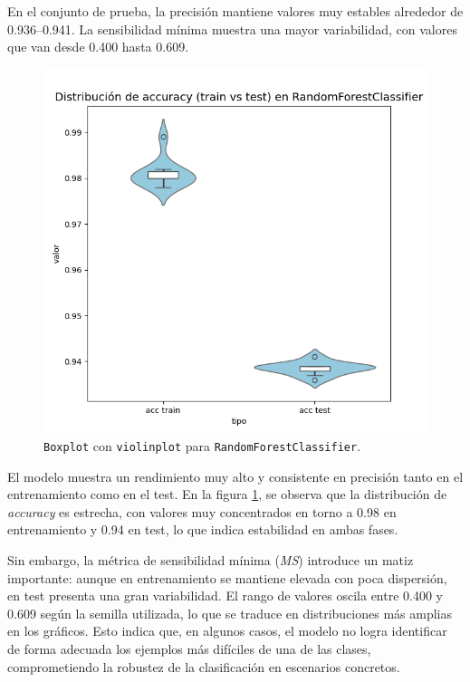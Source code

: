 En el conjunto de prueba, la precisión mantiene valores muy estables alrededor de 0.936–0.941. La sensibilidad mínima muestra una mayor variabilidad, con valores que van desde 0.400 hasta 0.609.

\begin{figure}[H]
	\centering
	\includegraphics[width=1\linewidth]{Imagenes/rf_bin}
	\caption[\texttt{Boxplot} con \texttt{violinplot} para \texttt{RandomForestClassifier}]{\texttt{Boxplot} con \texttt{violinplot} para \texttt{RandomForestClassifier}.}
	\label{fig:rf_bin}
\end{figure}

El modelo muestra un rendimiento muy alto y consistente en precisión tanto en el entrenamiento como en el test. En la figura \ref{fig:rf_bin}, se observa que la distribución de \textit{accuracy} es estrecha, con valores muy concentrados en torno a 0.98 en entrenamiento y 0.94 en test, lo que indica estabilidad en ambas fases.

\newpage
Sin embargo, la métrica de sensibilidad mínima (\textit{MS}) introduce un matiz importante: aunque en entrenamiento se mantiene elevada con poca dispersión, en test presenta una gran variabilidad. El rango de valores oscila entre 0.400 y 0.609 según la semilla utilizada, lo que se traduce en distribuciones más amplias en los gráficos. Esto indica que, en algunos casos, el modelo no logra identificar de forma adecuada los ejemplos más difíciles de una de las clases, comprometiendo la robustez de la clasificación en escenarios concretos.

